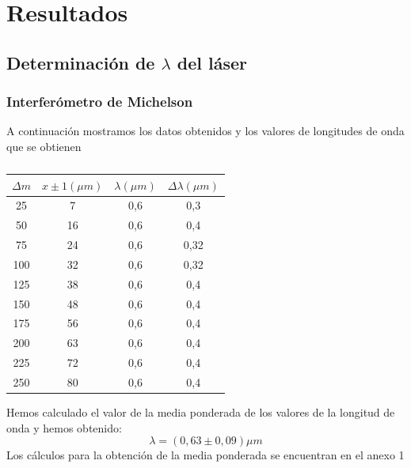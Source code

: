 \documentclass[11pt,letterpaper,twocolumn]{article}
\begin{document}
\section{Resultados}

\subsection{Determinación de $\lambda$ del láser }
\subsubsection{Interferómetro de Michelson}

A continuación mostramos los datos obtenidos y los valores de longitudes de onda que se obtienen
\begin{table}[H]
    \caption{}
    \begin{tabular}{|c|c|c|c|}
        \hline
        $\Delta m $ &$x \pm 1 \left( \mu m \right) $  & $\lambda \left( \mu m \right) $ & $\Delta \lambda \left( \mu m \right) $ \\ \hline
        25 & 7 & 0,6 & 0,3 \\ 
        50 & 16  & 0,6 & 0,4 \\
        75 & 24  & 0,6 & 0,32 \\
        100 & 32  & 0,6 & 0,32 \\
        125 & 38  & 0,6 & 0,4 \\
        150 & 48  & 0,6 & 0,4 \\ 
        175 & 56  & 0,6 & 0,4 \\ 
        200 & 63  & 0,6 & 0,4 \\
        225 & 72  & 0,6 & 0,4 \\
        250 & 80  & 0,6 & 0,4 \\ \hline
    \end{tabular}
    \label{}
\end{table}



Hemos calculado el valor de la media ponderada de los valores de la longitud de onda y hemos obtenido:
\begin{equation}
    \boxed{\lambda = \left( 0,63 \pm 0,09 \right) \mu m }
\end{equation}
Los cálculos para la obtención de la media ponderada se encuentran en el anexo 1 \\
\\
 
\end{document}
